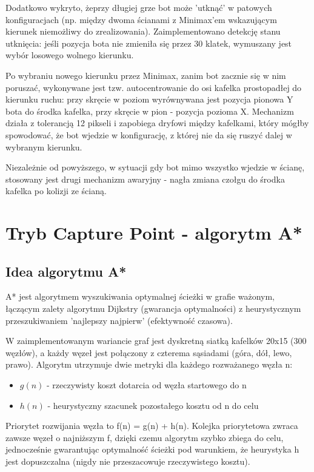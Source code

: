 Dodatkowo wykryto, żeprzy długiej grze bot może 'utknąć' w patowych konfiguracjach (np. między dwoma ścianami z Minimax'em 
wskazującym kierunek niemożliwy do zrealizowania). Zaimplementowano detekcję stanu utknięcia: 
jeśli pozycja bota nie zmieniła się przez 30 klatek, wymuszany jest wybór losowego wolnego kierunku.
 
Po wybraniu nowego kierunku przez Minimax, zanim bot zacznie się w nim poruszać, wykonywane jest tzw. autocentrowanie do osi 
kafelka prostopadłej do kierunku ruchu: przy skręcie w poziom wyrównywana jest pozycja pionowa Y
bota do środka kafelka, przy skręcie w pion - pozycja pozioma X. Mechanizm działa z tolerancją 12 pikseli i zapobiega 
dryfowi między kafelkami, który mógłby spowodować, że bot wjedzie w konfigurację, z której nie da się ruszyć dalej w wybranym kierunku.
 
Niezależnie od powyższego, w sytuacji gdy bot mimo wszystko wjedzie w ścianę, stosowany jest drugi mechanizm awaryjny - nagła 
zmiana czołgu do środka kafelka po kolizji ze ścianą.

\section{Tryb Capture Point - algorytm A*}
\subsection{Idea algorytmu A*}

A* jest algorytmem wyszukiwania optymalnej ścieżki w grafie ważonym, łączącym zalety algorytmu Dijkstry 
(gwarancja optymalności) z heurystycznym przeszukiwaniem 'najlepszy najpierw' (efektywność czasowa).
 
W zaimplementowanym wariancie graf jest dyskretną siatką kafelków 20x15 (300 węzłów), a każdy węzeł jest połączony z czterema 
sąsiadami (góra, dół, lewo, prawo). Algorytm utrzymuje dwie metryki dla każdego rozważanego węzła n:
 
\begin{itemize}
    \item $g(n)$ - rzeczywisty koszt dotarcia od węzła startowego do n
    \item $h(n)$ - heurystyczny szacunek pozostałego kosztu od n do  celu
\end{itemize}
 
Priorytet rozwijania węzła to f(n) = g(n) + h(n). Kolejka priorytetowa zwraca zawsze 
węzeł o najniższym f, dzięki czemu algorytm szybko zbiega do celu, jednocześnie gwarantując optymalność 
ścieżki pod warunkiem, że heurystyka h jest dopuszczalna (nigdy nie przeszacowuje rzeczywistego kosztu).

